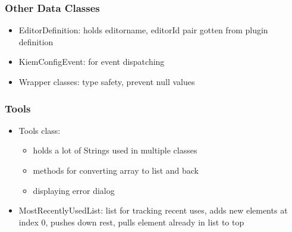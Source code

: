 \subsubsection{Other Data Classes}
\begin{itemize}
 \item EditorDefinition: holds editorname, editorId pair gotten from plugin definition
 \item KiemConfigEvent: for event dispatching
 \item Wrapper classes: type safety, prevent null values
\end{itemize}

\subsubsection{Tools}
\begin{itemize}
 \item Tools class:
  \begin{itemize}
    \item holds a lot of Strings used in multiple classes
    \item methods for converting array to list and back
    \item displaying error dialog
  \end{itemize}
 \item MostRecentlyUsedList: list for tracking recent uses, adds new elements at index 0, pushes down rest, pulls element already in list to top
\end{itemize}

